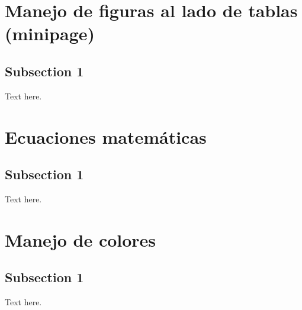 \documentclass[letterpaper, 10pt, journal]{IEEEtran}
\begin{document}
\section{Manejo de figuras al lado de tablas (minipage)}
\subsection{Subsection 1}
Text here.

\section{Ecuaciones matem\'aticas}
\subsection{Subsection 1}
Text here.

\section{Manejo de colores}
\subsection{Subsection 1}
Text here.
\end{document}

